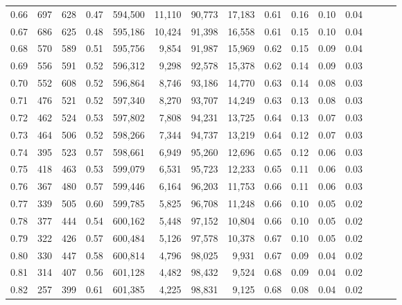 \begin{tabular}{rrrrrrrrrrrrrrr}
0.66 &     697 &    628 &  0.47 &  594,500 &   11,110 &   90,773 &   17,183 &  0.61 &  0.16 &  0.10 &      0.04 \\
0.67 &     686 &    625 &  0.48 &  595,186 &   10,424 &   91,398 &   16,558 &  0.61 &  0.15 &  0.10 &      0.04 \\
0.68 &     570 &    589 &  0.51 &  595,756 &    9,854 &   91,987 &   15,969 &  0.62 &  0.15 &  0.09 &      0.04 \\
0.69 &     556 &    591 &  0.52 &  596,312 &    9,298 &   92,578 &   15,378 &  0.62 &  0.14 &  0.09 &      0.03 \\
0.70 &     552 &    608 &  0.52 &  596,864 &    8,746 &   93,186 &   14,770 &  0.63 &  0.14 &  0.08 &      0.03 \\
0.71 &     476 &    521 &  0.52 &  597,340 &    8,270 &   93,707 &   14,249 &  0.63 &  0.13 &  0.08 &      0.03 \\
0.72 &     462 &    524 &  0.53 &  597,802 &    7,808 &   94,231 &   13,725 &  0.64 &  0.13 &  0.07 &      0.03 \\
0.73 &     464 &    506 &  0.52 &  598,266 &    7,344 &   94,737 &   13,219 &  0.64 &  0.12 &  0.07 &      0.03 \\
0.74 &     395 &    523 &  0.57 &  598,661 &    6,949 &   95,260 &   12,696 &  0.65 &  0.12 &  0.06 &      0.03 \\
0.75 &     418 &    463 &  0.53 &  599,079 &    6,531 &   95,723 &   12,233 &  0.65 &  0.11 &  0.06 &      0.03 \\
0.76 &     367 &    480 &  0.57 &  599,446 &    6,164 &   96,203 &   11,753 &  0.66 &  0.11 &  0.06 &      0.03 \\
0.77 &     339 &    505 &  0.60 &  599,785 &    5,825 &   96,708 &   11,248 &  0.66 &  0.10 &  0.05 &      0.02 \\
0.78 &     377 &    444 &  0.54 &  600,162 &    5,448 &   97,152 &   10,804 &  0.66 &  0.10 &  0.05 &      0.02 \\
0.79 &     322 &    426 &  0.57 &  600,484 &    5,126 &   97,578 &   10,378 &  0.67 &  0.10 &  0.05 &      0.02 \\
0.80 &     330 &    447 &  0.58 &  600,814 &    4,796 &   98,025 &    9,931 &  0.67 &  0.09 &  0.04 &      0.02 \\
0.81 &     314 &    407 &  0.56 &  601,128 &    4,482 &   98,432 &    9,524 &  0.68 &  0.09 &  0.04 &      0.02 \\
0.82 &     257 &    399 &  0.61 &  601,385 &    4,225 &   98,831 &    9,125 &  0.68 &  0.08 &  0.04 &      0.02 \\

\end{tabular}
